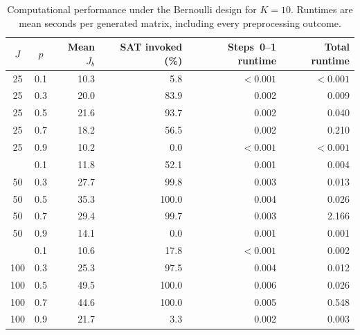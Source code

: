\begin{table}[htbp]
\centering\small
\begin{tabular}{ccrrrr}
\toprule
\(J\) & \(p\) & Mean \(J_b\) & SAT invoked (\%) & Steps~0--1 runtime & Total runtime\\
\midrule
25 & 0.1 & 10.3 & 5.8 & \(<0.001\) & \(<0.001\)\\
25 & 0.3 & 20.0 & 83.9 & 0.002 & 0.009\\
25 & 0.5 & 21.6 & 93.7 & 0.002 & 0.040\\
25 & 0.7 & 18.2 & 56.5 & 0.002 & 0.210\\
25 & 0.9 & 10.2 & 0.0 & \(<0.001\) & \(<0.001\)\\
\addlinespace
50 & 0.1 & 11.8 & 52.1 & 0.001 & 0.004\\
50 & 0.3 & 27.7 & 99.8 & 0.003 & 0.013\\
50 & 0.5 & 35.3 & 100.0 & 0.004 & 0.026\\
50 & 0.7 & 29.4 & 99.7 & 0.003 & 2.166\\
50 & 0.9 & 14.1 & 0.0 & 0.001 & 0.001\\
\addlinespace
100 & 0.1 & 10.6 & 17.8 & \(<0.001\) & 0.002\\
100 & 0.3 & 25.3 & 97.5 & 0.004 & 0.012\\
100 & 0.5 & 49.5 & 100.0 & 0.006 & 0.026\\
100 & 0.7 & 44.6 & 100.0 & 0.005 & 0.548\\
100 & 0.9 & 21.7 & 3.3 & 0.002 & 0.003\\
\bottomrule
\end{tabular}
\caption{Computational performance under the Bernoulli design for \(K=10\). Runtimes are mean seconds per generated matrix, including every preprocessing outcome.}
\label{tab:bern-computation}
\end{table}
